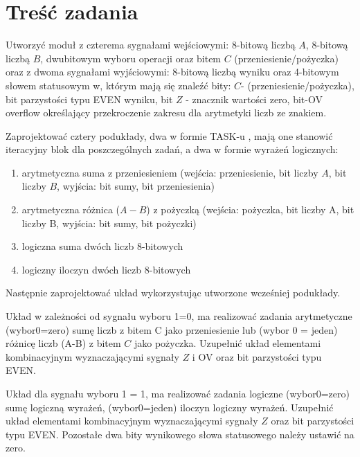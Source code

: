 \tableofcontents
\clearpage

\section{Treść zadania}

Utworzyć moduł z czterema sygnałami wejściowymi: 8-bitową liczbą $A$, 8-bitową liczbą $B$, dwubitowym wyboru operacji oraz bitem $C$ (przeniesienie/pożyczka) oraz z dwoma sygnałami wyjściowymi: 8-bitową liczbą wyniku oraz 4-bitowym słowem statusowym w, którym mają się znaleźć bity: $C$- (przeniesienie/pożyczka), bit parzystości typu EVEN wyniku, bit $Z$ - znacznik wartości zero, bit-OV overflow określający przekroczenie zakresu dla arytmetyki liczb ze znakiem.

\vspace{0.5cm}

Zaprojektować cztery podukłady, dwa w formie TASK-u , mają one stanowić iteracyjny blok dla poszczególnych zadań, a dwa w formie wyrażeń logicznych:

\begin{enumerate}
    \item arytmetyczna suma z przeniesieniem (wejścia: przeniesienie, bit liczby $A$, bit liczby $B$, wyjścia: bit sumy, bit przeniesienia)
    \item arytmetyczna różnica ($A-B$) z pożyczką (wejścia: pożyczka, bit liczby A, bit liczby B, wyjścia: bit sumy, bit pożyczki)
    \item logiczna suma dwóch liczb 8-bitowych
    \item logiczny iloczyn dwóch liczb 8-bitowych
\end{enumerate}

\vspace{0.5cm}

Następnie zaprojektować układ  wykorzystując utworzone wcześniej podukłady.  

\vspace{0.5cm}

Układ w zależności od sygnału wyboru 1=0, ma realizować zadania arytmetyczne (wybor0=zero) sumę liczb z  bitem C jako przeniesienie lub (wybor 0 = jeden) różnicę liczb (A-B) z bitem $C$ jako pożyczka. Uzupełnić układ elementami kombinacyjnym wyznaczającymi sygnały $Z$ i OV oraz bit parzystości typu EVEN.

\vspace{0.5cm}

Układ dla sygnału wyboru 1 = 1, ma realizować zadania logiczne (wybor0=zero) sumę logiczną wyrażeń, (wybor0=jeden) iloczyn logiczny wyrażeń. Uzupełnić układ elementami kombinacyjnym wyznaczającymi sygnały $Z$ oraz bit parzystości typu EVEN. Pozostałe dwa bity wynikowego słowa statusowego należy ustawić na zero.
\clearpage

